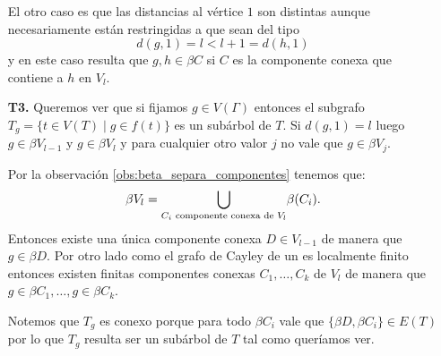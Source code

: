 \documentclass[tesis.tex]{subfiles}
\begin{document}
\begin{deff}
\begin{enumerate}
		El otro caso es que las distancias al vértice $1$ son distintas aunque necesariamente están restringidas a que sean del tipo
		\[
			d(g,1)= l < l+1 = d(h,1)
		\] 
		y en este caso resulta que $g,h \in \beta C$ si $C$ es la componente conexa que contiene a $h$ en $V_l$.
		
		\item[\textbf{T3.}] Queremos ver que si fijamos $g \in V(\Gamma)$ entonces el subgrafo $T_{g} = \{ t \in V(T) \mid g \in f(t) \} $ es un subárbol de $T$.
		Si $d(g,1) = l$ luego $g \in \beta V_{l-1}$ y $g \in \beta V_{l}$ y para cualquier otro valor $j$ no vale que $g \in \beta V_{j}$.
		
		Por la observación \ref{obs:beta_separa_componentes} tenemos que:
		\[
			\beta V_{l} = \underset{\text{\scriptsize $C_{i}$ componente conexa de $V_{l}$}}{\bigcup} \beta(C_{i}).
		\]
		Entonces existe una única componente conexa $D \in V_{l-1}$ de manera que $g \in \beta D$. 
		Por otro lado como el grafo de Cayley de un \fg es localmente finito entonces existen finitas componentes conexas $C_{1}, \dots, C_{k}$ de $V_{l}$ de manera que $g \in \beta C_{1}, \dots, g \in \beta C_{k}$.

		Notemos que $T_{g}$ es conexo porque para todo $\beta C_{i}$ vale que $\{ \beta D, \beta C_{i} \} \in E(T)$ por lo que $T_{g}$ resulta ser un subárbol de $T$ tal como queríamos ver.
		 
	\end{enumerate}
\end{deff}
\end{document}
